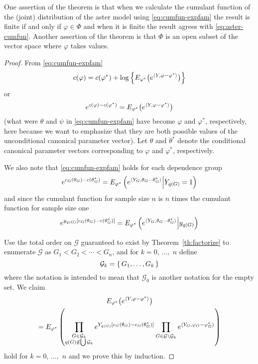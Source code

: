 One assertion of the theorem is that when we calculate the cumulant
function of the (joint) distribution of the aster model
using \eqref{eq:cumfun-expfam} the result is finite if and only if
$\varphi \in \Phi$ and when it is finite the result agrees with
\eqref{eq:aster-cumfun}.
Another assertion of the theorem is that $\Phi$ is an open subset of
the vector space where $\varphi$ takes values.

\begin{proof}
From \eqref{eq:cumfun-expfam}
$$
   c(\varphi)
   =
   c(\varphi^*) + \log\left\{
   E_{\varphi^*}\bigl( e^{\langle Y, \varphi - \varphi^* \rangle} \bigr) \right\}
$$
or
\begin{equation} \label{eq:cumfun-reg-one}
   e^{c(\varphi) - c(\varphi^*)}
   =
   E_{\varphi^*}\bigl( e^{\langle Y, \varphi - \varphi^* \rangle} \bigr)
\end{equation}
(what were $\theta$ and $\psi$ in \eqref{eq:cumfun-expfam} have
become $\varphi$ and $\varphi^*$, respectively,
here because we want to emphasize that they are both possible values
of the unconditional canonical parameter vector).
Let $\theta$ and $\theta^*$ denote the conditional canonical parameter
vectors corresponding to $\varphi$ and $\varphi^*$, respectively.

We also note that \eqref{eq:cumfun-expfam} holds for each dependence group
\begin{equation} \label{eq:cumfun-reg-too}
   e^{c_G(\theta_G) - c(\theta_G^*)}
   =
   E_{\varphi^*}\left(
   e^{\langle Y_G, \theta_G - \theta_G^* \rangle} \middle| Y_{q(G)} = 1 \right)
\end{equation}
and since the cumulant function for sample size $n$ is $n$ times the cumulant
function for sample size one
\begin{equation} \label{eq:cumfun-reg-too-too}
   e^{y_{q(G)} [c_G(\theta_G) - c(\theta_G^*)]}
   =
   E_{\varphi^*}\left(
   e^{\langle Y_G, \theta_G - \theta_G^* \rangle} \middle| y_{q(G)} \right)
\end{equation}

Use the total order on $\mathcal{G}$ guaranteed
to exist by Theorem~\ref{th:factorize}
to enumerate $\mathcal{G}$ as $G_1 < G_2 < \cdots < G_n$,
and for $k = 0$, $\ldots,$ $n$ define
$$
   \mathcal{G}_k = \{\,  G_1, \ldots, G_k  \,\}
$$
where the notation is intended to mean that $\mathcal{G}_0$ is another
notation for the empty set.  We claim
\begin{multline} \label{eq:reg-induction}
   E_{\varphi^*}\bigl( e^{\langle Y, \varphi - \varphi^* \rangle} \bigr)
   \\
   =
   E_{\varphi^*}\left(
   \prod_{\substack{G \in \mathcal{G}_k \\ q(G) \notin \bigcup \mathcal{G}_k}}
   e^{Y_{q(G)} [c_G(\theta_G) - c_G(\theta_G^*)]}
   \prod_{G \in \mathcal{G} \setminus \mathcal{G}_k}
   e^{\langle Y_G, \varphi_G - \varphi_G^* \rangle}
   \right)
\end{multline}
hold for $k = 0$, $\ldots,$ $n$ and we prove this by induction.


\end{proof}
